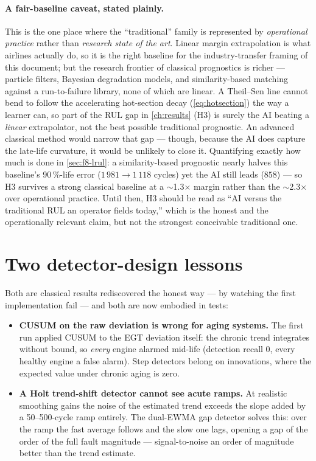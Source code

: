 \paragraph{A fair-baseline caveat, stated plainly.} This is the one place where the
``traditional'' family is represented by \emph{operational practice} rather than \emph{research
state of the art}. Linear margin extrapolation is what airlines actually do, so it is the
right baseline for the industry-transfer framing of this document; but the research frontier
of classical prognostics is richer --- particle filters, Bayesian degradation models, and
similarity-based matching against a run-to-failure library, none of which are linear. A
Theil--Sen line cannot bend to follow the accelerating hot-section decay
(\cref{eq:hotsection}) the way a learner can, so part of the RUL gap in \cref{ch:results} (H3)
is surely the AI beating a \emph{linear} extrapolator, not the best possible traditional
prognostic. An advanced classical method would narrow that gap --- though, because the AI does
capture the late-life curvature, it would be unlikely to close it. Quantifying exactly how
much is done in \cref{sec:f8-lrul}: a similarity-based prognostic nearly halves this baseline's
90\,\%-life error ($1\,981 \to 1\,118$ cycles) yet the AI still leads ($858$) --- so H3
survives a strong classical baseline at a $\sim$1.3$\times$ margin rather than the
$\sim$2.3$\times$ over operational practice. Until then, H3 should be read as
``AI versus the traditional RUL an operator fields today,'' which is the honest and the
operationally relevant claim, but not the strongest conceivable traditional one.

\section{Two detector-design lessons}
\label{sec:det-lessons}
\label{sec:trad-lessons}

Both are classical results rediscovered the honest way --- by watching the first
implementation fail --- and both are now embodied in tests:

\begin{itemize}
  \item \textbf{CUSUM on the raw deviation is wrong for aging systems.} The first run applied
    CUSUM to the EGT deviation itself: the chronic trend integrates without bound, so
    \emph{every} engine alarmed mid-life (detection recall 0, every healthy engine a false
    alarm). Step detectors belong on innovations, where the expected value under chronic aging
    is zero.
  \item \textbf{A Holt trend-shift detector cannot see acute ramps.} At realistic smoothing
    gains the noise of the estimated trend exceeds the slope added by a 50--500-cycle ramp
    entirely. The dual-EWMA gap detector solves this: over the ramp the fast average follows
    and the slow one lags, opening a gap of the order of the full fault magnitude ---
    signal-to-noise an order of magnitude better than the trend estimate.
\end{itemize}

